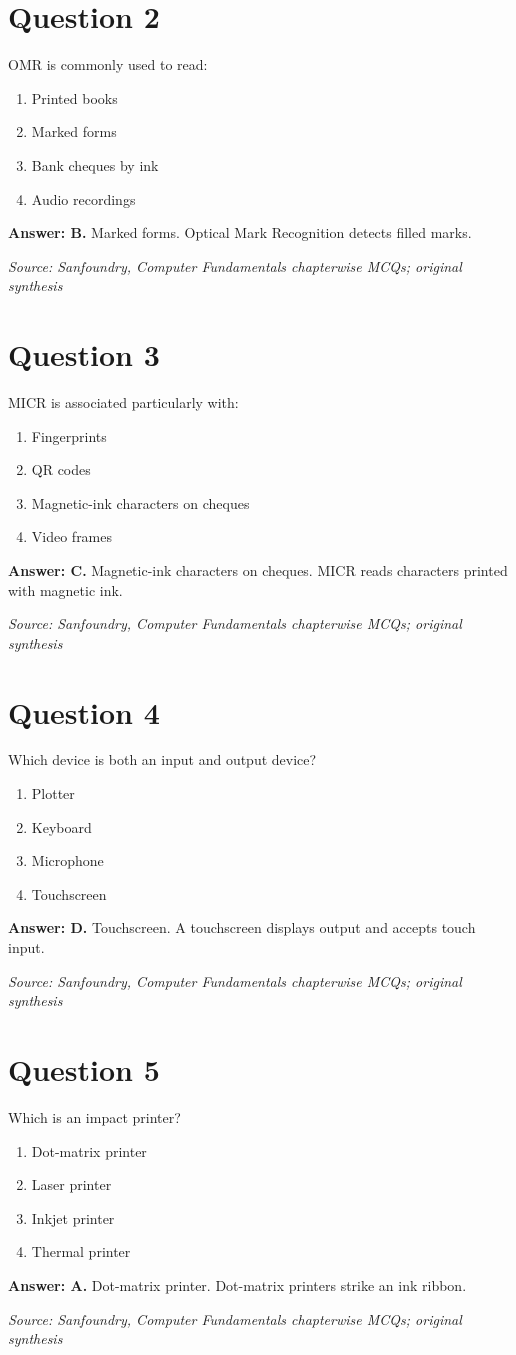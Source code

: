 \documentclass[11pt,a4paper]{book}
\newcommand{\source}[1]{\par\smallskip\textit{Source: #1}}
\newcommand{\answer}[2]{\par\textbf{Answer: #1.} #2}
\begin{document}
\section*{Question 2}
OMR is commonly used to read:
\begin{enumerate}[label=\Alph*.]
\item Printed books
\item Marked forms
\item Bank cheques by ink
\item Audio recordings
\end{enumerate}
\answer{B}{Marked forms. Optical Mark Recognition detects filled marks.}
\source{Sanfoundry, Computer Fundamentals chapterwise MCQs; original synthesis}
\section*{Question 3}
MICR is associated particularly with:
\begin{enumerate}[label=\Alph*.]
\item Fingerprints
\item QR codes
\item Magnetic-ink characters on cheques
\item Video frames
\end{enumerate}
\answer{C}{Magnetic-ink characters on cheques. MICR reads characters printed with magnetic ink.}
\source{Sanfoundry, Computer Fundamentals chapterwise MCQs; original synthesis}
\section*{Question 4}
Which device is both an input and output device?
\begin{enumerate}[label=\Alph*.]
\item Plotter
\item Keyboard
\item Microphone
\item Touchscreen
\end{enumerate}
\answer{D}{Touchscreen. A touchscreen displays output and accepts touch input.}
\source{Sanfoundry, Computer Fundamentals chapterwise MCQs; original synthesis}
\section*{Question 5}
Which is an impact printer?
\begin{enumerate}[label=\Alph*.]
\item Dot-matrix printer
\item Laser printer
\item Inkjet printer
\item Thermal printer
\end{enumerate}
\answer{A}{Dot-matrix printer. Dot-matrix printers strike an ink ribbon.}
\source{Sanfoundry, Computer Fundamentals chapterwise MCQs; original synthesis}
\end{document}
